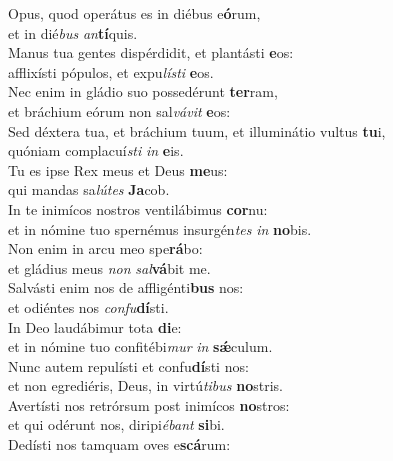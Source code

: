\evenverse Opus, quod operátus es in diébus e\textbf{ó}rum,~\*\\
\evenverse et in dié\textit{bus} \textit{an}\textbf{tí}quis.\\
\oddverse Manus tua gentes dispérdidit, et plantásti \textbf{e}os:~\*\\
\oddverse afflixísti pópulos, et expu\textit{lí}\textit{sti} \textbf{e}os.\\
\evenverse Nec enim in gládio suo possedérunt \textbf{ter}ram,~\*\\
\evenverse et bráchium eórum non sal\textit{vá}\textit{vit} \textbf{e}os:\\
\oddverse Sed déxtera tua, et bráchium tuum, et illuminátio vultus \textbf{tu}i,~\*\\
\oddverse quóniam complacuí\textit{sti} \textit{in} \textbf{e}is.\\
\evenverse Tu es ipse Rex meus et Deus \textbf{me}us:~\*\\
\evenverse qui mandas sa\textit{lú}\textit{tes} \textbf{Ja}cob.\\
\oddverse In te inimícos nostros ventilábimus \textbf{cor}nu:~\*\\
\oddverse et in nómine tuo spernémus insurgén\textit{tes} \textit{in} \textbf{no}bis.\\
\evenverse Non enim in arcu meo spe\textbf{rá}bo:~\*\\
\evenverse et gládius meus \textit{non} \textit{sal}\textbf{vá}bit me.\\
\oddverse Salvásti enim nos de affligénti\textbf{bus} nos:~\*\\
\oddverse et odiéntes nos \textit{con}\textit{fu}\textbf{dí}sti.\\
\evenverse In Deo laudábimur tota \textbf{di}e:~\*\\
\evenverse et in nómine tuo confitébi\textit{mur} \textit{in} \textbf{sǽ}culum.\\
\oddverse Nunc autem repulísti et confu\textbf{dí}sti nos:~\*\\
\oddverse et non egrediéris, Deus, in virtú\textit{ti}\textit{bus} \textbf{no}stris.\\
\evenverse Avertísti nos retrórsum post inimícos \textbf{no}stros:~\*\\
\evenverse et qui odérunt nos, diripi\textit{é}\textit{bant} \textbf{si}bi.\\
\oddverse Dedísti nos tamquam oves e\textbf{scá}rum:~\*\\
